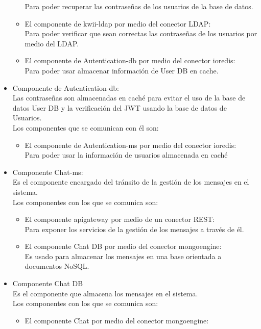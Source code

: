 \begin{itemize}
\begin{itemize}
        Para poder recuperar las contraseñas de los usuarios de la base de datos.
        \item El componente de kwii-ldap por medio del conector LDAP:\\
        Para poder verificar que sean correctas las contraseñas de los usuarios por medio del LDAP.
        \item El componente de Autentication-db por medio del conector ioredis:\\
        Para poder usar almacenar información de User DB en cache.
    \end{itemize}
    \item Componente de Autentication-db:\\
     Las contraseñas son almacenadas en caché para evitar el uso de la base de datos User DB y la verificación del JWT usando la base de datos de Usuarios.\\
     Los componentes que se comunican con él son:
     \begin{itemize}
        \item El componente de Autentication-ms por medio del conector ioredis:\\
        Para poder usar la información de usuarios almacenada en caché
    \end{itemize}
    \item Componente Chat-ms:\\
    Es el componente encargado del tránsito de la gestión de los mensajes en el sistema.\\
    Los componentes con los que se comunica son:
    \begin{itemize}
        \item El componente api\textunderscore gateway por medio de un conector REST:\\
        Para exponer los servicios de la gestión de los mensajes a través de él.
        \item El componente Chat DB por medio del conector mongoengine:\\
        Es usado para almacenar los mensajes en una base orientada a documentos NoSQL.
    \end{itemize}
    \item Componente Chat DB\\
    Es el componente que almacena los mensajes en el sistema.\\
    Los componentes con los que se comunica son:
    \begin{itemize}
        \item El componente Chat por medio del conector mongoengine:\\

\end{itemize}
\end{itemize}
